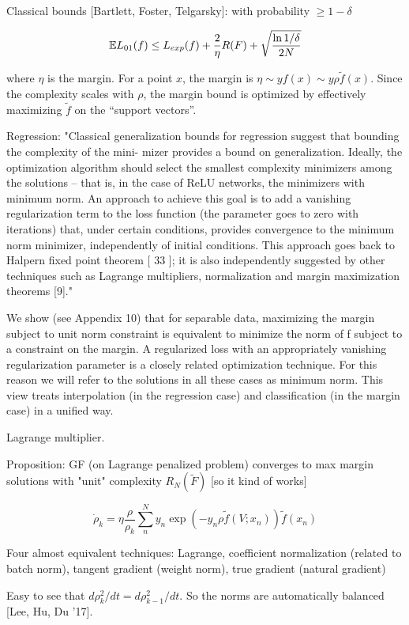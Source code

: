 \documentclass[english]{article}
\begin{document}
Classical bounds [Bartlett, Foster, Telgarsky]: with probability $\ge 1-\delta$

$$\mathbb{E} L_{01}(f) \le L_{exp}(f)
+ 
\frac2\eta R(F)
+ 
\sqrt{\frac{\ln 1/\delta}{2N}}
$$

where $\eta$ is the margin. For a point $x$, the margin is $\eta \sim yf(x)  \sim y \rho \tilde f(x)$. Since the complexity scales with $\rho$, the margin bound is optimized by effectively maximizing $\tilde f$
on the “support vectors”.

Regression: 
"Classical generalization bounds for regression suggest that bounding the complexity of the mini-
mizer provides a bound on generalization. Ideally, the optimization algorithm should select the
smallest complexity minimizers among the solutions – that is, in the case of ReLU networks,
the minimizers with minimum norm. An approach to achieve this goal is to add a vanishing
regularization term to the loss function (the parameter goes to zero with iterations) that, under
certain conditions, provides convergence to the minimum norm minimizer, independently of
initial conditions. This approach goes back to Halpern fixed point theorem [ 33 ]; it is also
independently suggested by other techniques such as Lagrange multipliers, normalization and
margin maximization theorems [9]."

We show (see Appendix 10) that for separable data, maximizing the margin subject to unit
norm constraint is equivalent to minimize the norm of f subject to a constraint on the margin.
A regularized loss with an appropriately vanishing regularization parameter is a closely related
optimization technique. For this reason we will refer to the solutions in all these cases as minimum
norm. This view treats interpolation (in the regression case) and classification (in the margin
case) in a unified way.

\item Lagrange multiplier. 

Proposition: GF (on Lagrange penalized problem) converges to max margin solutions with "unit" complexity $R_N(\tilde F)$ [so it kind of works]

$$
\dot \rho_k 
= 
\eta
\frac{\rho}{\rho_k}
\sum_n^N y_n\exp(-y_n\rho \tilde f(V;x_n))
\tilde f(x_n)
$$

Four almost equivalent techniques: Lagrange, coefficient normalization (related to batch norm), tangent gradient (weight norm), true gradient (natural gradient)

Easy to see that $d\rho_k^2/dt = d\rho_{k-1}^2/dt$. So the norms are automatically balanced [Lee, Hu, Du '17]. 
\end{document}
